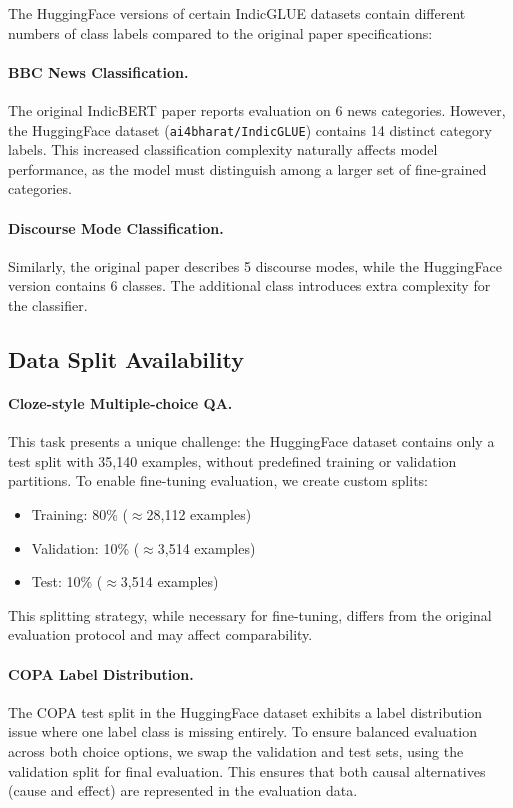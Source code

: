 The HuggingFace versions of certain IndicGLUE datasets contain different numbers of class labels compared to the original paper specifications:

\paragraph{BBC News Classification.} The original IndicBERT paper reports evaluation on 6 news categories. However, the HuggingFace dataset (\texttt{ai4bharat/IndicGLUE}) contains 14 distinct category labels. This increased classification complexity naturally affects model performance, as the model must distinguish among a larger set of fine-grained categories.

\paragraph{Discourse Mode Classification.} Similarly, the original paper describes 5 discourse modes, while the HuggingFace version contains 6 classes. The additional class introduces extra complexity for the classifier.

\subsection{Data Split Availability}

\paragraph{Cloze-style Multiple-choice QA.} This task presents a unique challenge: the HuggingFace dataset contains only a test split with 35,140 examples, without predefined training or validation partitions. To enable fine-tuning evaluation, we create custom splits:
\begin{itemize}
    \item Training: 80\% ($\approx$28,112 examples)
    \item Validation: 10\% ($\approx$3,514 examples)
    \item Test: 10\% ($\approx$3,514 examples)
\end{itemize}
This splitting strategy, while necessary for fine-tuning, differs from the original evaluation protocol and may affect comparability.

\paragraph{COPA Label Distribution.} The COPA test split in the HuggingFace dataset exhibits a label distribution issue where one label class is missing entirely. To ensure balanced evaluation across both choice options, we swap the validation and test sets, using the validation split for final evaluation. This ensures that both causal alternatives (cause and effect) are represented in the evaluation data.

